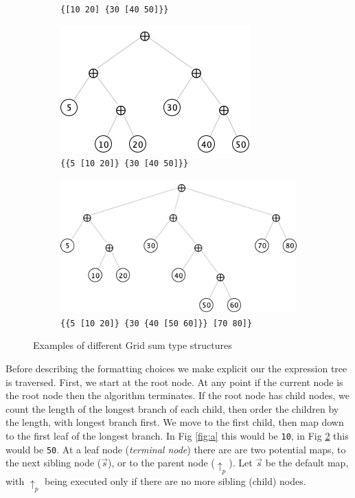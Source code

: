 \documentclass[11pt]{article}
\begin{document}
\begin{figure}[h]
\begin{subfigure}[b]{.45\textwidth}
    		\caption{\texttt{\{[10 20] \{30 [40 50]\}\}}}\label{fig:d}
    \end{subfigure}
    \begin{subfigure}[b]{.45\textwidth}
    		\centering
    		\includegraphics[scale=.5]{diags/tree5.png}
    		\caption{\texttt{\{\{5 [10 20]\} \{30 [40 50]\}\}}}\label{fig:e}
    \end{subfigure}
    \begin{subfigure}[b]{.7\textwidth}
    		\centering
    		\includegraphics[scale=.5]{diags/tree6.png}
    		\caption{\texttt{\{\{5 [10 20]\} \{30 \{40 [50 60]\}\} [70 80]\}}}\label{fig:f}
    \end{subfigure}
  \caption{Examples of different Grid sum type structures}
  \label{fig:tree_examples}
\end{figure}

Before describing the formatting choices we make explicit our the expression tree is traversed. First, we start at the root node. At any point if the current node is the root node then the algorithm terminates. If the root node has child nodes, we count the length of the longest branch of each child, then order the children by the length, with longest branch first. We move to the first child, then map down to the first leaf of the longest branch.  In Fig \ref{fig:a} this would be \texttt{10}, in Fig \ref{fig:e} this would be \texttt{50}. At a leaf node (\textit{terminal node}) there are are two potential maps, to the next sibling node ($\overrightarrow{s}$), or to the parent node ($\uparrow_p$). Let $\overrightarrow{s}$ be the default map, with $\uparrow_p$ being executed only if there are no more sibling (child) nodes. 
\end{document}
